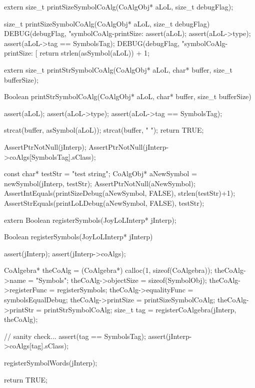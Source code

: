 
\startCHeader
extern size_t printSizeSymbolCoAlg(CoAlgObj* aLoL, size_t debugFlag);
\stopCHeader

\startCCode
size_t printSizeSymbolCoAlg(CoAlgObj* aLoL, size_t debugFlag) {
  DEBUG(debugFlag, "symbolCoAlg-printSize: %
  assert(aLoL);
  assert(aLoL->type);
  assert(aLoL->tag == SymbolsTag);
  DEBUG(debugFlag, "symbolCoAlg-printSize: [%
  return strlen(asSymbol(aLoL)) + 1;
}
\stopCCode

\startCHeader
extern size_t printStrSymbolCoAlg(CoAlgObj* aLoL,
                                  char* buffer, size_t bufferSize);
\stopCHeader

\startCCode
Boolean printStrSymbolCoAlg(CoAlgObj* aLoL,
                           char* buffer, size_t bufferSize) {
  assert(aLoL);
  assert(aLoL->type);
  assert(aLoL->tag == SymbolsTag);

  strcat(buffer, asSymbol(aLoL));
  strcat(buffer, " ");
  return TRUE;
}
\stopCCode


\startCTest
  AssertPtrNotNull(jInterp);
  AssertPtrNotNull(jInterp->coAlgs[SymbolsTag].sClass);

  const char* testStr = "test string";
  CoAlgObj* aNewSymbol = newSymbol(jInterp, testStr);
  AssertPtrNotNull(aNewSymbol);
  AssertIntEquals(printSizeDebug(aNewSymbol, FALSE), strlen(testStr)+1);
  AssertStrEquals(printLoLDebug(aNewSymbol, FALSE), testStr);
\stopCTest
\stopTestCase
\stopTestSuite

\startTestSuite[registerSymbols]

\startCHeader
extern Boolean registerSymbols(JoyLoLInterp* jInterp);
\stopCHeader
{}

\startCCode
Boolean registerSymbols(JoyLoLInterp* jInterp) {
  assert(jInterp);
  assert(jInterp->coAlgs);
  
  CoAlgebra* theCoAlg    = (CoAlgebra*) calloc(1, sizeof(CoAlgebra));
  theCoAlg->name         = "Symbols";
  theCoAlg->objectSize   = sizeof(SymbolObj);
  theCoAlg->registerFunc = registerSymbols;
  theCoAlg->equalityFunc = symbolsEqualDebug;
  theCoAlg->printSize    = printSizeSymbolCoAlg;
  theCoAlg->printStr    = printStrSymbolCoAlg;
  size_t tag = registerCoAlgebra(jInterp, theCoAlg);
  
  // sanity check...
  assert(tag == SymbolsTag);
  assert(jInterp->coAlgs[tag].sClass);

  registerSymbolWords(jInterp);

  return TRUE;
}
\stopCCode

